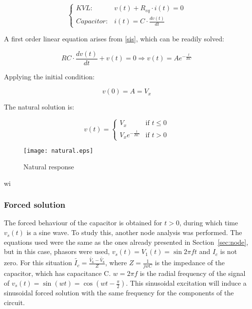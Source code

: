 \begin{equation}
  \begin{cases}
    KVL: & v(t) + R_{eq} \cdot i(t) = 0 \\
    Capacitor: & i(t) = C \cdot \frac{dv(t)}{dt}
  \end{cases}
  \label{sis}
\end{equation}

A first order linear equation arises from \ref{sis}, which can be readily solved:

\begin{equation}
  RC \cdot \frac{dv(t)}{dt} + v(t) = 0 \Rightarrow v(t) = Ae^{-\frac{t}{RC}}
\end{equation}

Applying the initial condition:

\begin{equation}
  v(0) = A = V_x
\end{equation}

The natural solution is:

\begin{equation}
  \label{nat_sol} v(t) =
  \begin{cases}
    V_x & \mbox{if } t \leq 0 \\
    V_xe^{-\frac{t}{RC}} & \mbox{if } t > 0
  \end{cases}
\end{equation}

\begin{figure}[H]
  \centering
  \texttt{[image: natural.eps]}
  \caption{Natural response}
  \label{fig:nat}
\end{figure}wi

\subsubsection{Forced solution}

The forced behaviour of the capacitor is obtained for $t > 0$, during which time $v_s(t)$ is a sine wave. To study this, another node analysis was performed. The equations used were the same as the ones already presented in Section~\ref{sec:node}, but in this case, phasors were used, $v_s(t) = V_1(t) = \sin{2\pi ft}$ and $I_c$ is not zero. For this situation $\widetilde{I_c} = \frac{\widetilde{V_6}-\widetilde{V_8}}{Z}$, where $Z = \frac{1}{jwC}$ is the impedance of the capacitor, which has capacitance C. $w = 2\pi f$ is the radial frequency of the signal of $v_s(t) = \sin(wt) = \cos(wt-\frac{\pi}{2})$. This sinusoidal excitation will induce a sinusoidal forced solution with the same frequency for the components of the circuit.

